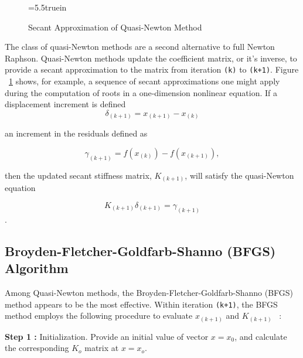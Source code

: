 \begin{figure} [t]
\epsfxsize=5.5truein
\centerline{}
\caption{Secant Approximation of Quasi-Newton Method}
\label{fig:scant_method}
\end{figure}

\vspace{0.15 in}
\noindent\hspace{0.5 in}
The class of quasi-Newton methods are a second alternative to full Newton Raphson.
Quasi-Newton methods update the coefficient matrix, or it's inverse, to provide a
secant approximation to the matrix from iteration {\tt (k)} to {\tt (k+1)}.
Figure ~\ref{fig:scant_method} shows, for example,
a sequence of secant approximations one might apply during the
computation of roots in a one-dimension nonlinear equation.
If a displacement increment is defined
\begin{equation}
\delta_{(k+1)} = x_{(k+1)} - x_{(k)} 
\label{eq: delta}
\end{equation}

\vspace{0.15 in}\noindent
an increment in the residuals defined as

\begin{equation}
\gamma_{(k+1)} = f(x_{(k)}) - f(x_{(k+1)}),
\label{eq: gamma}
\end{equation}

\vspace{0.15 in}\noindent
then the updated secant stiffness matrix, $K_{(k+1)}$,
will satisfy the quasi-Newton equation 

\[ K_{(k+1)} \delta_{(k+1)} = \gamma_{(k+1)} \].

\subsection{Broyden-Fletcher-Goldfarb-Shanno (BFGS) Algorithm}

\vspace{0.15 in}
\noindent\hspace{0.50 in}
Among Quasi-Newton methods,
the Broyden-Fletcher-Goldfarb-Shanno (BFGS) method appears to be the most effective.
Within iteration {\tt (k+1)}, the BFGS method employs
the following procedure to evaluate $x_{(k+1)}$ and $K_{(k+1)}$ ~\cite{bathe80}:

\vspace{0.15 in}\noindent
{\bf Step 1 :}
Initialization. Provide an initial value of vector $x = x_0$,
and calculate the corresponding $K_o$ matrix at $x = x_o$.

